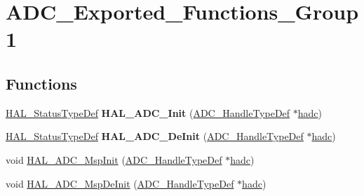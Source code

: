 \hypertarget{group___a_d_c___exported___functions___group1}{\section{A\-D\-C\-\_\-\-Exported\-\_\-\-Functions\-\_\-\-Group1}
\label{group___a_d_c___exported___functions___group1}
}
\subsection*{Functions}
\begin{DoxyCompactItemize}
\item 
\hypertarget{group___a_d_c___exported___functions___group1_ga33ddb73d4880bd425aaa43c5c52bb13a}{\hyperlink{stm32l1xx__hal__def_8h_a63c0679d1cb8b8c684fbb0632743478f}{H\-A\-L\-\_\-\-Status\-Type\-Def} {\bfseries H\-A\-L\-\_\-\-A\-D\-C\-\_\-\-Init} (\hyperlink{struct_a_d_c___handle_type_def}{A\-D\-C\-\_\-\-Handle\-Type\-Def} $\ast$\hyperlink{stm32l1xx__it_8c_a62fcafba91cf315db7e0e0c8f22c656f}{hadc})}\label{group___a_d_c___exported___functions___group1_ga33ddb73d4880bd425aaa43c5c52bb13a}

\item 
\hypertarget{group___a_d_c___exported___functions___group1_ga165940b437c6a8843c6032199adbf0a8}{\hyperlink{stm32l1xx__hal__def_8h_a63c0679d1cb8b8c684fbb0632743478f}{H\-A\-L\-\_\-\-Status\-Type\-Def} {\bfseries H\-A\-L\-\_\-\-A\-D\-C\-\_\-\-De\-Init} (\hyperlink{struct_a_d_c___handle_type_def}{A\-D\-C\-\_\-\-Handle\-Type\-Def} $\ast$\hyperlink{stm32l1xx__it_8c_a62fcafba91cf315db7e0e0c8f22c656f}{hadc})}\label{group___a_d_c___exported___functions___group1_ga165940b437c6a8843c6032199adbf0a8}

\item 
void \hyperlink{group___a_d_c___exported___functions___group1_gaa30863492d5c3103e3e8ce8a63dadd07}{H\-A\-L\-\_\-\-A\-D\-C\-\_\-\-Msp\-Init} (\hyperlink{struct_a_d_c___handle_type_def}{A\-D\-C\-\_\-\-Handle\-Type\-Def} $\ast$\hyperlink{stm32l1xx__it_8c_a62fcafba91cf315db7e0e0c8f22c656f}{hadc})
\item 
void \hyperlink{group___a_d_c___exported___functions___group1_ga39b0f8e80268ab3e660ead921ad4b22f}{H\-A\-L\-\_\-\-A\-D\-C\-\_\-\-Msp\-De\-Init} (\hyperlink{struct_a_d_c___handle_type_def}{A\-D\-C\-\_\-\-Handle\-Type\-Def} $\ast$\hyperlink{stm32l1xx__it_8c_a62fcafba91cf315db7e0e0c8f22c656f}{hadc})
\end{DoxyCompactItemize}


